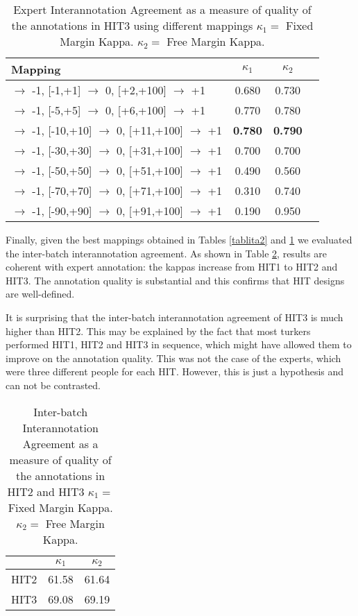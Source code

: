 \documentclass[11pt]{elsarticle}
\begin{document}
\begin{table}[h]
\begin{center}
\begin{tabular}{|l|c|c|c|}
\hline
Mapping & $\kappa_{1}$ & $\kappa_{2}$ \\
\hline
 [-100,-2] $\rightarrow$ -1, [-1,+1] $\rightarrow$ 0, [+2,+100] $\rightarrow$ +1& 0.680 & 0.730\\ \hline
 [-100,-6] $\rightarrow$ -1, [-5,+5] $\rightarrow$ 0, [+6,+100] $\rightarrow$ +1& 0.770 & 0.780\\ \hline
 [-100,-11] $\rightarrow$ -1, [-10,+10] $\rightarrow$ 0, [+11,+100] $\rightarrow$ +1& \textbf{0.780} & \textbf{0.790}\\ \hline
 [-100,-31] $\rightarrow$ -1, [-30,+30] $\rightarrow$ 0, [+31,+100] $\rightarrow$ +1& 0.700 & 0.700\\ \hline
 [-100,-51] $\rightarrow$ -1, [-50,+50] $\rightarrow$ 0, [+51,+100] $\rightarrow$ +1& 0.490 & 0.560\\ \hline
 [-100,-71] $\rightarrow$ -1, [-70,+70] $\rightarrow$ 0, [+71,+100] $\rightarrow$ +1& 0.310 & 0.740\\ \hline
[-100,-91] $\rightarrow$ -1, [-90,+90] $\rightarrow$ 0, [+91,+100] $\rightarrow$ +1& 0.190 & 0.950\\ \hline
\end{tabular}
\end{center}
\caption{Expert Interannotation Agreement as a measure of quality of the annotations in HIT3 using different mappings $\kappa_{1} = $ Fixed Margin Kappa. $\kappa_{2} = $ Free Margin Kappa.}
\label{tablita3}
\end{table}

Finally, given the best mappings obtained in Tables \ref{tablita2} and \ref{tablita3} we evaluated the inter-batch interannotation agreement. As shown in Table \ref{tablita4}, results are coherent with expert annotation: the kappas increase from HIT1 to HIT2 and HIT3. The annotation quality is substantial and this confirms that HIT designs are well-defined.

It is surprising that the inter-batch interannotation agreement of HIT3 is much higher than HIT2. This may be explained by the fact that most turkers performed HIT1, HIT2 and HIT3 in sequence, which might have allowed them to improve on the annotation quality. This was not the case of the experts, which were three different people for each HIT. However, this is just a hypothesis and can not be contrasted.

\begin{table}[h]
\begin{center}
\begin{tabular}{|l|c|c|}
\hline
 & $\kappa_{1}$ & $\kappa_{2}$ \\
\hline
HIT2& 61.58 & 61.64\\ \hline
HIT3& 69.08 & 69.19\\ \hline
\end{tabular}
\end{center}
\caption{Inter-batch Interannotation Agreement as a measure of quality of the annotations in HIT2 and HIT3 $\kappa_{1} = $ Fixed Margin Kappa. $\kappa_{2} = $ Free Margin Kappa.}
\label{tablita4}
\end{table}
\end{document}
